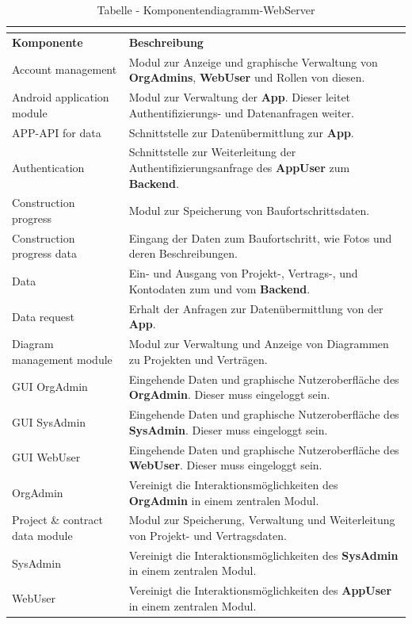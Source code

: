 \begin{longtable}[h]{|p{2.5cm}|p{10.0cm}|}
	\caption{Tabelle - Komponentendiagramm-WebServer}
	\centering
	\label{tab:table_comp_webserver}
	\endlastfoot
	\hline \multicolumn{2}{|r|}{{Weitergeführt auf der folgenden Seite}} \\ \hline
	\endfoot
	\endhead
	\hline
	\textbf{Komponente} & \textbf{Beschreibung} \\
	\hline
	Account management & Modul zur Anzeige und graphische Verwaltung von \textbf{OrgAdmins}, \textbf{WebUser} und Rollen von diesen. \\
	\hline
	Android application module & Modul zur Verwaltung der \textbf{App}. Dieser leitet Authentifizierungs- und Datenanfragen weiter. \\
	\hline
	APP-API for data & Schnittstelle zur Datenübermittlung zur \textbf{App}. \\
	\hline
	Authentication & Schnittstelle zur Weiterleitung der Authentifizierungsanfrage des \textbf{AppUser} zum \textbf{Backend}. \\
	\hline
	Construction progress & Modul zur Speicherung von Baufortschrittsdaten. \\
	\hline
	Construction progress data & Eingang der Daten zum Baufortschritt, wie Fotos und deren Beschreibungen. \\
	\hline
	Data & Ein- und Ausgang von Projekt-, Vertrags-, und Kontodaten zum und vom \textbf{Backend}. \\
	\hline
	Data request & Erhalt der Anfragen zur Datenübermittlung von der \textbf{App}. \\
	\hline
	Diagram management module & Modul zur Verwaltung und Anzeige von Diagrammen zu Projekten und Verträgen. \\
	\hline
	GUI OrgAdmin & Eingehende Daten und graphische Nutzeroberfläche des \textbf{OrgAdmin}. Dieser muss eingeloggt sein. \\
	\hline
	GUI SysAdmin & Eingehende Daten und graphische Nutzeroberfläche des \textbf{SysAdmin}. Dieser muss eingeloggt sein. \\
	\hline
	GUI WebUser & Eingehende Daten und graphische Nutzeroberfläche des \textbf{WebUser}. Dieser muss eingeloggt sein. \\
	\hline
	OrgAdmin & Vereinigt die Interaktionsmöglichkeiten des \textbf{OrgAdmin} in einem zentralen Modul. \\
	\hline
	Project {\&} contract data module & Modul zur Speicherung, Verwaltung und Weiterleitung von Projekt- und Vertragsdaten. \\
	\hline
	SysAdmin & Vereinigt die Interaktionsmöglichkeiten des \textbf{SysAdmin} in einem zentralen Modul. \\
	\hline
	WebUser & Vereinigt die Interaktionsmöglichkeiten des \textbf{AppUser} in einem zentralen Modul. \\
	\hline
\end{longtable}

